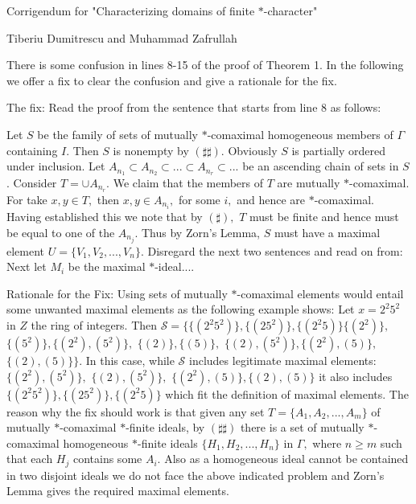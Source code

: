 \documentclass{article}
\begin{document}
\begin{center}
Corrigendum for "Characterizing domains of finite $\ast $-character"

Tiberiu Dumitrescu and Muhammad Zafrullah

\bigskip
\end{center}

There is some confusion in lines 8-15 of the proof of Theorem 1. In the
following we offer a fix to clear the confusion and give a rationale for the
fix.

The fix: Read the proof from the sentence that starts from line 8 as follows:

Let $S$ be the family of sets of mutually $\ast $-comaximal homogeneous
members of $\Gamma $ containing $I$. Then $S$ is nonempty by $(\sharp \sharp
).$ Obviously $S$ is partially ordered under inclusion. Let $%
A_{n_{1}}\subset A_{n_{2}}\subset ...\subset A_{n_{r}}\subset ...$ be an
ascending chain of sets in $S$. Consider $T=\cup A_{n_{r}}.$ We claim that
the members of $T$ are mutually $\ast $-comaximal. For take $x,y\in T,$ then 
$x,y\in A_{n_{i}},$ for some $i,$ and hence are $\ast $-comaximal. Having
established this we note that by $(\sharp ),$ $T$ must be finite and hence
must be equal to one of the $A_{n_{j}}.$ Thus by Zorn's Lemma, $S$ must have
a maximal element $U=\{V_{1},V_{2},...,V_{n}\}.$ Disregard the next two
sentences and read on from: Next let $M_{i}$ be the maximal $\ast $-ideal....

Rationale for the Fix: Using sets of mutually $\ast $-comaximal elements
would entail some unwanted maximal elements as the following example shows:
Let $x=2^{2}5^{2}$ in $Z$ the ring of integers. Then $\mathcal{S}%
=\{\{(2^{2}5^{2})\},\{(25^{2})\},\{(2^{2}5)\}\{(2^{2})\},$ $%
\{(5^{2})\},\{(2^{2}),(5^{2})\},$ $\{(2)\},\{(5)\},$ $\{(2),(5^{2})\},%
\{(2^{2}),(5)\},$ $\{(2),(5)\}\}.$ In this case, while $\mathcal{S}$
includes legitimate maximal elements: $\{(2^{2}),(5^{2})\},$ $%
\{(2),(5^{2})\},$ $\{(2^{2}),(5)\},\{(2),(5)\}$ it also includes $%
\{(2^{2}5^{2})\},\{(25^{2})\},\{(2^{2}5)\}$ which fit the definition of
maximal elements. The reason why the fix should work is that given any set $%
T=\{A_{1},A_{2},...,A_{m}\}$ of mutually $\ast $-comaximal $\ast $-finite
ideals, by $(\sharp \sharp )$ there is a set of mutually $\ast $-comaximal
homogeneous $\ast $-finite ideals $\{H_{1},H_{2},...,H_{n}\}$ in $\Gamma ,$
where $n\geq m$ such that each $H_{j}$ contains some $A_{i}.$ Also as a
homogeneous ideal cannot be contained in two disjoint ideals we do not face
the above indicated problem and Zorn's Lemma gives the required maximal
elements.
\end{document}
